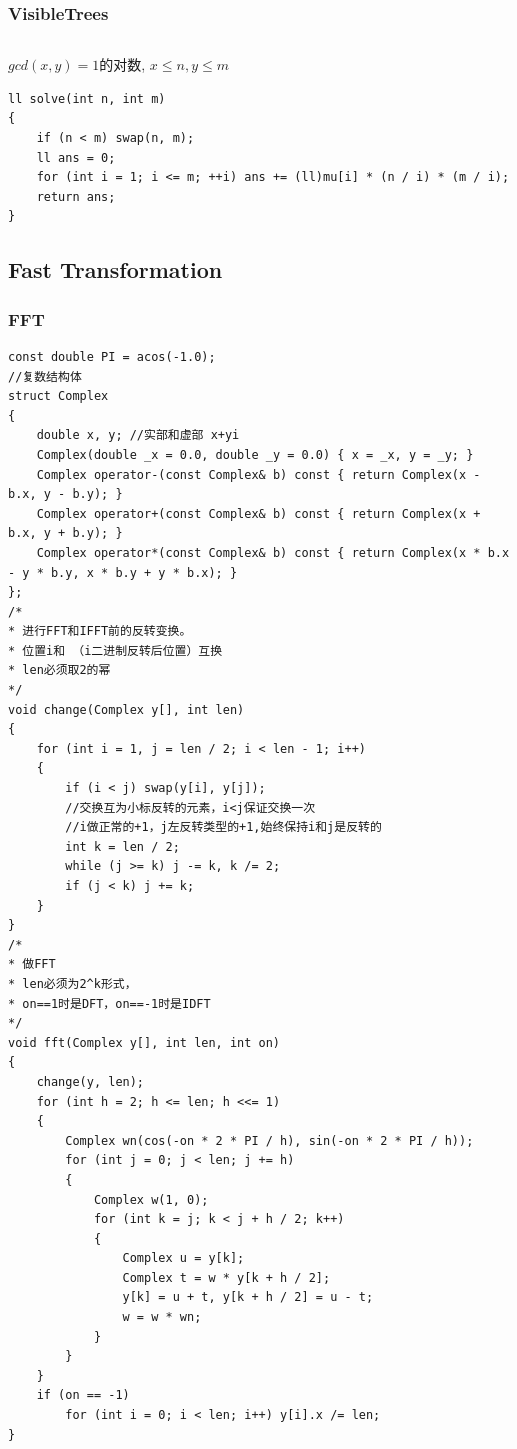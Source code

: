 \documentclass[twoside]{article}
\begin{document}
\subsubsection{VisibleTrees}
\begin{lstlisting}
\end{lstlisting}
$gcd(x,y)=1$的对数, $x \leq n, y \leq m$
\begin{lstlisting}
ll solve(int n, int m)
{
    if (n < m) swap(n, m);
    ll ans = 0;
    for (int i = 1; i <= m; ++i) ans += (ll)mu[i] * (n / i) * (m / i);
    return ans;
}
\end{lstlisting}
\subsection{Fast Transformation}
\subsubsection{FFT}
\begin{lstlisting}
const double PI = acos(-1.0);
//复数结构体
struct Complex
{
    double x, y; //实部和虚部 x+yi
    Complex(double _x = 0.0, double _y = 0.0) { x = _x, y = _y; }
    Complex operator-(const Complex& b) const { return Complex(x - b.x, y - b.y); }
    Complex operator+(const Complex& b) const { return Complex(x + b.x, y + b.y); }
    Complex operator*(const Complex& b) const { return Complex(x * b.x - y * b.y, x * b.y + y * b.x); }
};
/*
* 进行FFT和IFFT前的反转变换。
* 位置i和 （i二进制反转后位置）互换
* len必须取2的幂
*/
void change(Complex y[], int len)
{
    for (int i = 1, j = len / 2; i < len - 1; i++)
    {
        if (i < j) swap(y[i], y[j]);
        //交换互为小标反转的元素，i<j保证交换一次
        //i做正常的+1，j左反转类型的+1,始终保持i和j是反转的
        int k = len / 2;
        while (j >= k) j -= k, k /= 2;
        if (j < k) j += k;
    }
}
/*
* 做FFT
* len必须为2^k形式，
* on==1时是DFT，on==-1时是IDFT
*/
void fft(Complex y[], int len, int on)
{
    change(y, len);
    for (int h = 2; h <= len; h <<= 1)
    {
        Complex wn(cos(-on * 2 * PI / h), sin(-on * 2 * PI / h));
        for (int j = 0; j < len; j += h)
        {
            Complex w(1, 0);
            for (int k = j; k < j + h / 2; k++)
            {
                Complex u = y[k];
                Complex t = w * y[k + h / 2];
                y[k] = u + t, y[k + h / 2] = u - t;
                w = w * wn;
            }
        }
    }
    if (on == -1)
        for (int i = 0; i < len; i++) y[i].x /= len;
}
\end{lstlisting}
\end{document}
